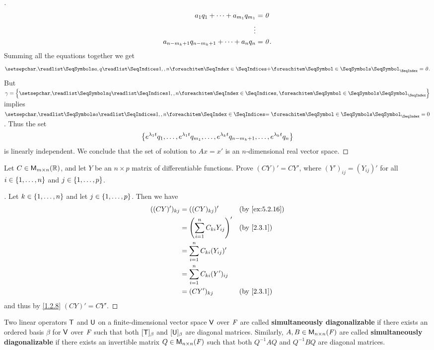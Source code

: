 \begin{proof}[]
\begin{align*}
    a_1 q_1 + \cdots + a_{m_1} q_{m_1}                 & = \mathit{0}  \\
    \vdots                                                      \\
    a_{n - m_k + 1} q_{n - m_k + 1} + \cdots + a_n q_n & = \mathit{0}.
  \end{align*}
  Summing all the equations together we get
  \[
    \seq[+]{a,q}{1,,n} = \zv.
  \]
  But \(\gamma = \set{\seq{q}{1,,n}}\) implies \(\seq[=]{a}{1,,n} = 0\).
  Thus the set
  \[
    \left\lbrace e^{\lambda_1 t} q_1, \dots, e^{\lambda_1 t} q_{m_1}, \dots, e^{\lambda_k t} q_{n - m_k + 1}, \dots, e^{\lambda_k t} q_n\right\rbrace
  \]
  is linearly independent.
  We conclude that the set of solution to \(Ax = x'\) is an \(n\)-dimensional real vector space.
\end{proof}

\begin{ex}\label{ex:5.2.16}
  Let \(C \in \mathsf{M}_{{m} \times n}({\mathbb{R}})\), and let \(Y\) be an \(n \times p\) matrix of differentiable functions.
  Prove \((CY)' = C Y'\), where \((Y')_{i j} = (Y_{i j})'\) for all \(i \in \left\lbrace1, \dots, n\right\rbrace\) and \(j \in \left\lbrace1, \dots, p\right\rbrace\).
\end{ex}

\begin{proof}[]
  Let \(k \in \left\lbrace1, \dots, n\right\rbrace\) and let \(j \in \left\lbrace1, \dots, p\right\rbrace\).
  Then we have
  \begin{align*}
    ((CY)')_{k j} & = ((CY)_{k j})'                        &  & \text{(by \cref{ex:5.2.16})} \\
                  & = \pa{\sum_{i = 1}^n C_{k i} Y_{i j}}' &  & \text{(by \cref{2.3.1})}     \\
                  & = \sum_{i = 1}^n C_{k i} (Y_{i j})'                                      \\
                  & = \sum_{i = 1}^n C_{k i} (Y')_{i j}                                      \\
                  & = (C Y')_{k j}                         &  & \text{(by \cref{2.3.1})}
  \end{align*}
  and thus by \cref{1.2.8} \((CY)' = C Y'\).
\end{proof}

\begin{defn}\label{5.2.8}
  Two linear operators \(\mathsf{T}\) and \(\mathsf{U}\) on a finite-dimensional vector space \(\mathsf{V}\) over \(\mathit{F}\) are called \textbf{simultaneously diagonalizable} if there exists an ordered basis \(\beta\) for \(\mathsf{V}\) over \(\mathit{F}\) such that both \([\mathsf{T}]_{\beta}\) and \([\mathsf{U}]_{\beta}\) are diagonal matrices.
  Similarly, \(A, B \in \mathsf{M}_{{n} \times n}({\mathit{F}})\) are called \textbf{simultaneously diagonalizable} if there exists an invertible matrix \(Q \in \mathsf{M}_{{n} \times n}({\mathit{F}})\) such that both \(Q^{-1} A Q\) and \(Q^{-1} B Q\) are diagonal matrices.
\end{defn}

